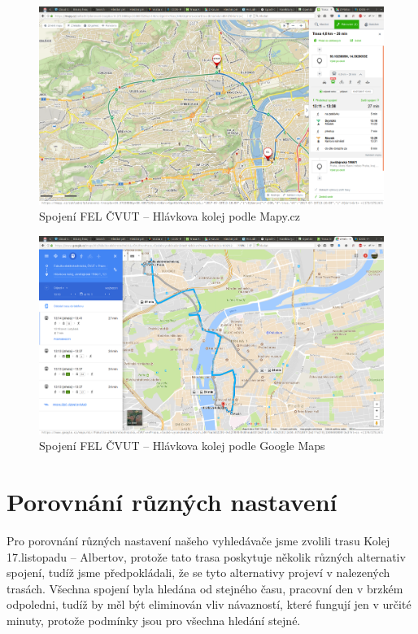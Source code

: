 \begin{figure}[h]
  \centering
    \includegraphics[width=\textwidth]{../img/fel-hlavkova-seznam.png}
  \caption{Spojení FEL ČVUT -- Hlávkova kolej podle Mapy.cz}
  \label{fig:fel-hlavkova-seznam}
\end{figure}
\begin{figure}[h]
  \centering
    \includegraphics[width=\textwidth]{../img/fel-hlavkova-google.png}
  \caption{Spojení FEL ČVUT -- Hlávkova kolej podle Google Maps}
  \label{fig:fel-hlavkova-google}
\end{figure}
\section{Porovnání různých nastavení}
Pro porovnání různých nastavení našeho vyhledávače jsme zvolili trasu Kolej
17.listopadu -- Albertov, protože tato trasa poskytuje několik různých
alternativ spojení, tudíž jsme předpokládali, že se tyto alternativy projeví v
nalezených trasách. Všechna spojení byla hledána od stejného času, pracovní den
v brzkém odpoledni, tudíž by měl být eliminován vliv návazností, které fungují
jen v určité minuty, protože podmínky jsou pro všechna hledání stejné.

